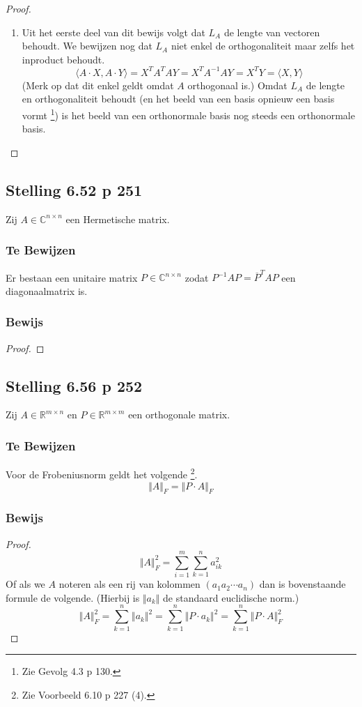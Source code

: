 \documentclass[lineaire_algebra_oplossingen.tex]{subfiles}
\begin{document}
\begin{proof}
\begin{enumerate}
\item
Uit het eerste deel van dit bewijs volgt dat $L_A$ de lengte van vectoren behoudt. We bewijzen nog dat $L_A$ niet enkel de orthogonaliteit maar zelfs het inproduct behoudt.
\[
\langle A\cdot X, A\cdot Y \rangle = X^T A^T A Y = X^T A^{-1} A Y = X^T Y = \langle X, Y \rangle
\]
(Merk op dat dit enkel geldt omdat $A$ orthogonaal is.)
Omdat $L_A$ de lengte en orthogonaliteit behoudt (en het beeld van een basis opnieuw een basis vormt \footnote{Zie Gevolg 4.3 p 130.}) is het beeld van een orthonormale basis nog steeds een orthonormale basis.
\end{enumerate}
\end{proof}


\subsection{Stelling 6.52 p 251}
\label{6.52}
Zij $A \in \mathbb{C}^{n\times n}$ een Hermetische matrix.

\subsubsection*{Te Bewijzen}
Er bestaan een unitaire matrix $P \in \mathbb{C}^{n\times n}$ zodat $P^{-1}AP = \overline{P}^TAP$ een diagonaalmatrix is.

\subsubsection*{Bewijs}
\begin{proof}
\end{proof}


\subsection{Stelling 6.56 p 252}
\label{6.56}
Zij $A \in \mathbb{R}^{m\times n}$ en $P \in \mathbb{R}^{m\times m}$ een orthogonale matrix.

\subsubsection*{Te Bewijzen}
Voor de Frobeniusnorm geldt het volgende \footnote{Zie Voorbeeld 6.10 p 227 (4).}.
\[
\Vert A\Vert_F = \Vert P\cdot A\Vert_F
\]

\subsubsection*{Bewijs}
\begin{proof}
\[
\Vert A\Vert_F^2 = \sum_{i=1}^m\sum_{k=1}^na_{ik}^2
\]
Of als we $A$ noteren als een rij van kolommen $(a_1 a_2 \cdots a_n)$ dan is bovenstaande formule de volgende. (Hierbij is $\Vert a_{k}\Vert$ de standaard euclidische norm.)
\[
\Vert A\Vert_F^2
= \sum_{k=1}^n\Vert a_{k}\Vert^2
= \sum_{k=1}^n\Vert P\cdot a_{k}\Vert^2
= \sum_{k=1}^n\Vert P\cdot A\Vert^2_F
\]
\end{proof}
\end{document}
